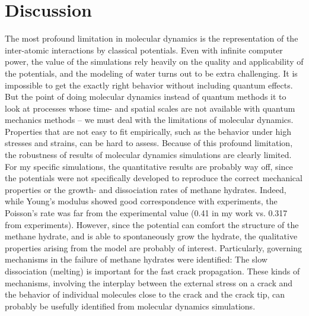 \section{Discussion}

The most profound limitation in molecular dynamics is the representation of the inter-atomic interactions by classical potentials. Even with infinite computer power, the value of the simulations rely heavily on the quality and applicability of the potentials, and the modeling of water turns out to be extra challenging. It is impossible to get the exactly right behavior without including quantum effects. But the point of doing molecular dynamics instead of quantum methods it to look at processes whose time- and spatial scales are not available with quantum mechanics methods -- we must deal with the limitations of molecular dynamics. Properties that are not easy to fit empirically, such as the behavior under high stresses and strains, can be hard to assess. Because of this profound limitation, the robustness of results of molecular dynamics simulations are clearly limited. For my specific simulations, the quantitative results are probably way off, since the potentials were not specifically developed to reproduce the correct mechanical properties or the growth- and dissociation rates of methane hydrates. Indeed, while Young's modulus showed good correspondence with experiments, the Poisson's rate was far from the experimental value (0.41 in my work vs. 0.317 from experiments). However, since the potential can comfort the structure of the methane hydrate, and is able to spontaneously grow the hydrate, the qualitative properties arising from the model are probably of interest. Particularly, governing mechanisms in the failure of methane hydrates were identified: The slow dissociation (melting) is important for the fast crack propagation. These kinds of mechanisms,  involving the interplay between the external stress on a crack and the behavior of individual molecules close to the crack and the crack tip, can probably be usefully identified from molecular dynamics simulations.

